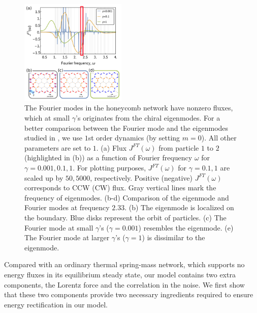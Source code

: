 \documentclass[
 preprint,
 preprintnumbers,
 amsmath,amssymb,
 aps,
 pre,
 longbibliography,
 superscriptaddress,
 10pt, twocolumn
]{revtex4-1}
\begin{document}
\begin{figure}[ht]
	\centering
	\includegraphics[width=0.45\textwidth]{2_Fourier_modes.pdf}
    \caption{The Fourier modes in the honeycomb network have nonzero fluxes, which at small $\gamma$'s originates from the chiral eigenmodes. For a better comparison between the Fourier mode and the eigenmodes studied in \cite{Nash2015TopologicalMechanics}, we use $1$st order dynamics (by setting $m=0$). All other parameters are set to $1$.
    (a) Flux $J^{FT}(\omega)$ from particle $1$ to $2$ (highlighted in (b)) as a function of Fourier frequency $\omega$ for $\gamma=0.001,0.1,1$. For plotting purposes, $J^{FT}(\omega)$ for $\gamma=0.1,1$ are scaled up by $50,5000$, respectively. Positive (negative) $J^{FT}(\omega)$ corresponds to CCW (CW) flux. Gray vertical lines mark the frequency of eigenmodes.
    (b-d) Comparison of the eigenmode and Fourier modes at frequency $2.33$.
    (b) The eigenmode is localized on the boundary. Blue disks represent the orbit of particles.
    (c) The Fourier mode at small $\gamma$'s ($\gamma=0.001$) resembles the eigenmode.
    (e) The Fourier mode at larger $\gamma$'s ($\gamma=1$) is dissimilar to the eigenmode.
    }
    \label{fig:Fourier_modes}
\end{figure}


Compared with an ordinary thermal spring-mass network, which supports no energy fluxes in its equilibrium steady state, our model contains two extra components, the Lorentz force and the correlation in the noise.
We first show that these two components provide two necessary ingredients required to ensure energy rectification in our model.
\end{document}
